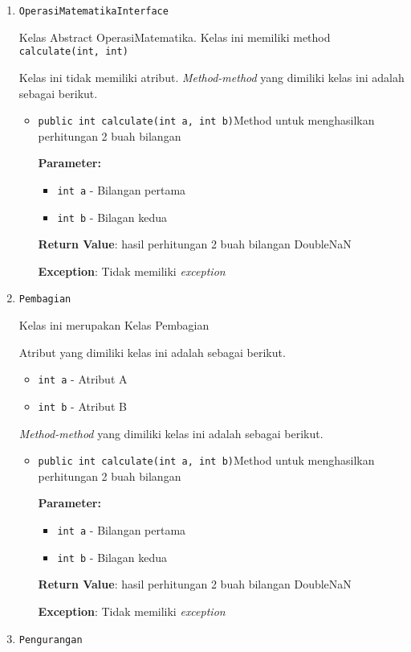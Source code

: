 \documentclass{article}
\begin{document}
\begin{enumerate}
\item \texttt{OperasiMatematikaInterface}

Kelas Abstract OperasiMatematika. Kelas ini memiliki method \texttt{calculate(int, int)}

Kelas ini tidak memiliki atribut. \textit{Method-method} yang dimiliki kelas ini adalah sebagai berikut.
\begin{itemize}
\item \texttt{public int calculate(int a, int b)}Method untuk menghasilkan perhitungan 2 buah bilangan

\textbf{Parameter:}
\begin{itemize}
\item \texttt{int a} - 
Bilangan pertama
\item \texttt{int b} - 
Bilagan kedua
\end{itemize}
\textbf{Return Value}: hasil perhitungan 2 buah bilangan  DoubleNaN

\textbf{Exception}: Tidak memiliki \textit{exception}

\end{itemize}
\item \texttt{Pembagian}

Kelas ini merupakan Kelas Pembagian

Atribut yang dimiliki kelas ini adalah sebagai berikut.
\begin{itemize}
\item \texttt{int a} - Atribut A
\item \texttt{int b} - Atribut B
\end{itemize}
\textit{Method-method} yang dimiliki kelas ini adalah sebagai berikut.
\begin{itemize}
\item \texttt{public int calculate(int a, int b)}Method untuk menghasilkan perhitungan 2 buah bilangan

\textbf{Parameter:}
\begin{itemize}
\item \texttt{int a} - 
Bilangan pertama
\item \texttt{int b} - 
Bilagan kedua
\end{itemize}
\textbf{Return Value}: hasil perhitungan 2 buah bilangan  DoubleNaN

\textbf{Exception}: Tidak memiliki \textit{exception}

\end{itemize}
\item \texttt{Pengurangan}


\end{enumerate}
\end{document}
